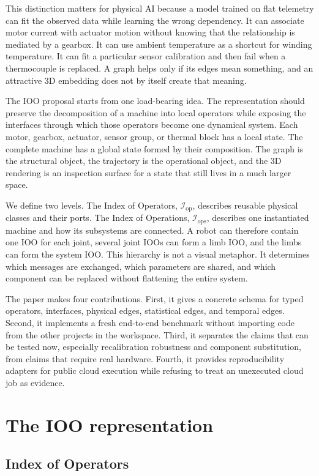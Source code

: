 \documentclass[11pt]{article}
\newcommand{\Iop}{\mathcal{I}_{\mathrm{op}}}
\newcommand{\Iops}{\mathcal{I}_{\mathrm{ops}}}
\begin{document}
This distinction matters for physical AI because a model trained on flat telemetry can fit the observed data while learning the wrong dependency. It can associate motor current with actuator motion without knowing that the relationship is mediated by a gearbox. It can use ambient temperature as a shortcut for winding temperature. It can fit a particular sensor calibration and then fail when a thermocouple is replaced. A graph helps only if its edges mean something, and an attractive 3D embedding does not by itself create that meaning.

The IOO proposal starts from one load-bearing idea. The representation should preserve the decomposition of a machine into local operators while exposing the interfaces through which those operators become one dynamical system. Each motor, gearbox, actuator, sensor group, or thermal block has a local state. The complete machine has a global state formed by their composition. The graph is the structural object, the trajectory is the operational object, and the 3D rendering is an inspection surface for a state that still lives in a much larger space.

We define two levels. The Index of Operators, $\Iop$, describes reusable physical classes and their ports. The Index of Operations, $\Iops$, describes one instantiated machine and how its subsystems are connected. A robot can therefore contain one IOO for each joint, several joint IOOs can form a limb IOO, and the limbs can form the system IOO. This hierarchy is not a visual metaphor. It determines which messages are exchanged, which parameters are shared, and which component can be replaced without flattening the entire system.

The paper makes four contributions. First, it gives a concrete schema for typed operators, interfaces, physical edges, statistical edges, and temporal edges. Second, it implements a fresh end-to-end benchmark without importing code from the other projects in the workspace. Third, it separates the claims that can be tested now, especially recalibration robustness and component substitution, from claims that require real hardware. Fourth, it provides reproducibility adapters for public cloud execution while refusing to treat an unexecuted cloud job as evidence.

\section{The IOO representation}

\subsection{Index of Operators}
\end{document}
